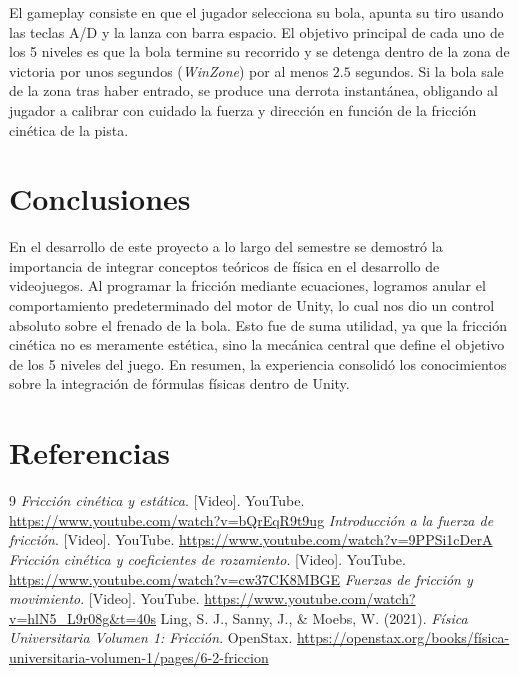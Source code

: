 \documentclass[11pt,letterpaper,twocolumn]{article}
\begin{document}
El gameplay consiste en que el jugador selecciona su bola, apunta su tiro usando las teclas A/D y la lanza con barra espacio. El objetivo principal de cada uno de los 5 niveles es que la bola termine su recorrido y se detenga dentro de la zona de victoria por unos segundos (\textit{WinZone}) por al menos $2.5$ segundos. Si la bola sale de la zona tras haber entrado, se produce una derrota instantánea, obligando al jugador a calibrar con cuidado la fuerza y dirección en función de la fricción cinética de la pista.

\section{Conclusiones}
En el desarrollo de este proyecto a lo largo del semestre se demostró la importancia de integrar conceptos teóricos de física en el desarrollo de videojuegos. Al programar la fricción mediante ecuaciones, logramos anular el comportamiento predeterminado del motor de Unity, lo cual nos dio un control absoluto sobre el frenado de la bola. Esto fue de suma utilidad, ya que la fricción cinética no es meramente estética, sino la mecánica central que define el objetivo de los 5 niveles del juego. En resumen, la experiencia consolidó los conocimientos sobre la integración de fórmulas físicas dentro de Unity.

\section{Referencias}
\begin{thebibliography}{9}
 \textit{Fricción cinética y estática}. [Video]. YouTube. \href{https://www.youtube.com/watch?v=bQrEqR9t9ug}{https://www.youtube.com/watch?v=bQrEqR9t9ug}
 \textit{Introducción a la fuerza de fricción}. [Video]. YouTube. \href{https://www.youtube.com/watch?v=9PPSi1cDerA}{https://www.youtube.com/watch?v=9PPSi1cDerA}
 \textit{Fricción cinética y coeficientes de rozamiento}. [Video]. YouTube. \href{https://www.youtube.com/watch?v=cw37CK8MBGE}{https://www.youtube.com/watch?v=cw37CK8MBGE}
 \textit{Fuerzas de fricción y movimiento}. [Video]. YouTube. \href{https://www.youtube.com/watch?v=hlN5_L9r08g&t=40s}{https://www.youtube.com/watch?v=hlN5\_L9r08g\&t=40s}
 Ling, S. J., Sanny, J., \& Moebs, W. (2021). \textit{Física Universitaria Volumen 1: Fricción}. OpenStax. \href{https://openstax.org/books/f\%C3\%ADsica-universitaria-volumen-1/pages/6-2-friccion}{https://openstax.org/books/física-universitaria-volumen-1/pages/6-2-friccion}
\end{thebibliography}
\end{document}

